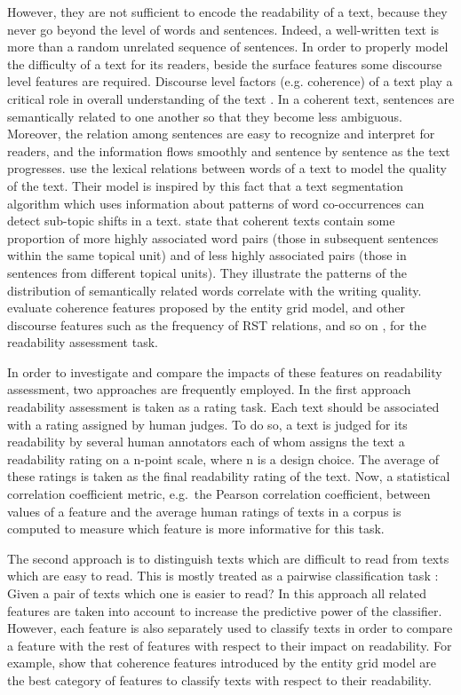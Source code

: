 However, they are not sufficient to encode the readability of a text, because they never go beyond the level of words and sentences. 
Indeed, a well-written text is more than a random unrelated sequence of sentences. 
In order to properly model the difficulty of a text for its readers, beside the surface features some discourse level features  are required. 
Discourse level factors (e.g. coherence) of a text play a critical role in overall understanding of the text \cite{pitler08}.  
In a coherent text, sentences are semantically related to one another so that they become less ambiguous.   
Moreover, the relation among sentences are easy to recognize and interpret for readers, and the information flows smoothly and sentence by sentence as the text progresses. 
 use the lexical relations between words of a text to model the quality of the text. 
Their model is inspired by this fact that a text segmentation algorithm which uses information about patterns of word co-occurrences can detect sub-topic shifts in a text. 
 state that coherent texts contain some proportion of more highly associated word pairs (those in subsequent sentences within the same topical unit) and of less highly associated pairs (those in sentences from different topical units).  
They illustrate the patterns of the distribution of semantically related words correlate with the writing quality. 
 evaluate coherence features proposed by the entity grid model, and other discourse features such as the frequency of RST relations, and so on , for the readability assessment task.  

In order to investigate and compare the impacts of these features on readability assessment, two approaches are frequently employed. 
In the first approach  \cite{pitler08,kate10} readability assessment is taken as a rating task. 
Each text should be associated with a rating assigned by human judges. 
To do so, a text is judged for its readability by several human annotators each of whom assigns the text a readability rating on a n-point scale, where n is a design choice.  
The average of these ratings is taken as the final readability rating of the text. 
Now, a statistical correlation coefficient metric, e.g.\ the Pearson correlation coefficient, between values of a feature and the average human ratings of texts in a corpus is computed to measure which feature is more informative for this task. 

The second approach is to distinguish texts which are difficult to read from texts which are easy to read. 
This is mostly treated as a pairwise classification task \cite{pitler08,guinaudeau13,barzilay08}: Given a pair of texts which one is easier to read? 
In this approach all related features are taken into account to increase the predictive power of the classifier. 
However, each feature is also separately used to classify texts in order to compare a feature with the rest of features with respect to their impact on readability.  
For example,  show that coherence features introduced by the entity grid model are the best category of features to classify texts with respect to their readability. 

